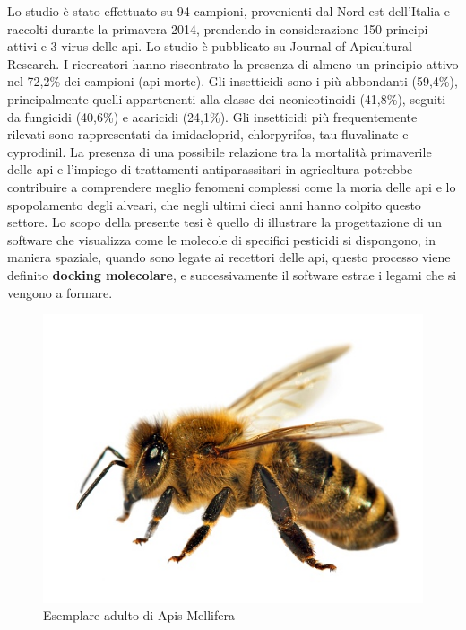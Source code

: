 Lo studio è stato effettuato su 94 campioni, provenienti dal Nord-est dell’Italia e raccolti durante la primavera 2014, prendendo in considerazione 150 principi attivi e 3 virus delle api. Lo studio è pubblicato su Journal of Apicultural Research. I ricercatori hanno riscontrato la presenza di almeno un principio attivo nel 72,2\% dei campioni (api morte). Gli insetticidi sono i più abbondanti (59,4\%), principalmente quelli appartenenti alla classe dei neonicotinoidi (41,8\%), seguiti da fungicidi (40,6\%) e acaricidi (24,1\%). Gli insetticidi più frequentemente rilevati sono rappresentati da imidacloprid, chlorpyrifos, tau-fluvalinate e cyprodinil.\newline
La presenza di una possibile relazione tra la mortalità primaverile delle api e l’impiego di trattamenti antiparassitari in agricoltura potrebbe contribuire a comprendere meglio fenomeni complessi come la moria delle api e lo spopolamento degli alveari, che negli ultimi dieci anni hanno colpito questo settore\cite{martinello2017spring}.\newline
Lo scopo della presente tesi è quello di illustrare la progettazione di un software che visualizza come le molecole di specifici pesticidi si dispongono, in maniera spaziale, quando sono legate ai recettori delle api, questo processo viene definito \textbf{docking molecolare}, e successivamente il software estrae i legami che si vengono a formare.

\begin{figure}[H]
    \centering
    \includegraphics{immagini/capitolo1/apisMellifera.png}
    \caption{Esemplare adulto di Apis Mellifera}
    \label{fig:Apis Mellifera}
\end{figure}

